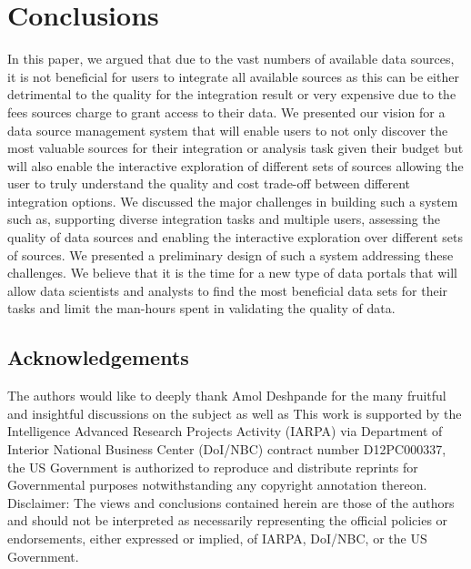 \documentclass{sig-alternate}
\begin{document}
\section{Conclusions}
\label{sec:conclusion}
In this paper, we argued that due to the vast numbers of available data sources, it is not beneficial for users to integrate all available sources as this can be either detrimental to the quality for the integration result or very expensive due to the fees sources charge to grant access to their data. We presented our vision for a data source management system that will enable users to not only discover the most valuable sources for their integration or analysis task given their budget but will also enable the interactive exploration of different sets of sources allowing the user to truly understand the quality and cost trade-off between different integration options. We discussed the major challenges in building such a system such as, supporting diverse integration tasks and multiple users, assessing the quality of data sources and enabling the interactive exploration over different sets of sources. We presented a preliminary design of such a system addressing these challenges. We believe that it is the time for a new type of data portals that will allow data scientists and analysts to find the most beneficial data sets for their tasks and limit the man-hours spent in validating the quality of data. 

\subsection*{Acknowledgements}
The authors would like to deeply thank Amol Deshpande for the many fruitful and insightful discussions on the subject as well as  
This work is supported by the Intelligence Advanced Research Projects Activity (IARPA) via Department of Interior National Business Center
(DoI/NBC) contract number D12PC000337, the US Government is authorized to reproduce and distribute reprints for Governmental purposes
notwithstanding any copyright annotation thereon. Disclaimer: The views and conclusions contained herein are those of the authors and should
not be interpreted as necessarily representing the official policies or endorsements, either expressed or implied, of IARPA, DoI/NBC, or the
US Government.
\end{document}
